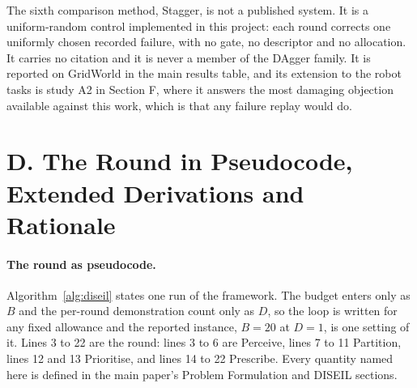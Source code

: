 \documentclass[letterpaper]{article}
\begin{document}
The sixth comparison method, Stagger, is not a published system. It is a uniform-random
control implemented in this project: each round corrects one uniformly chosen recorded
failure, with no gate, no descriptor and no allocation. It carries no citation and it
is never a member of the DAgger family. It is reported on GridWorld in the main results
table, and its extension to the robot tasks is study A2 in Section F, where it answers
the most damaging objection available against this work, which is that any failure
replay would do.

\section{D. The Round in Pseudocode, Extended Derivations and Rationale}

\paragraph{The round as pseudocode.}
Algorithm~\ref{alg:diseil} states one run of the framework. The budget enters only as
$B$ and the per-round demonstration count only as $D$, so the loop is written for any
fixed allowance and the reported instance, $B = 20$ at $D = 1$, is one setting of it.
Lines 3 to 22 are the round: lines 3 to 6 are Perceive, lines 7 to 11 Partition, lines 12
and 13 Prioritise, and lines 14 to 22 Prescribe. Every quantity named here is defined in
the main paper's Problem Formulation and DISEIL sections.
\end{document}
